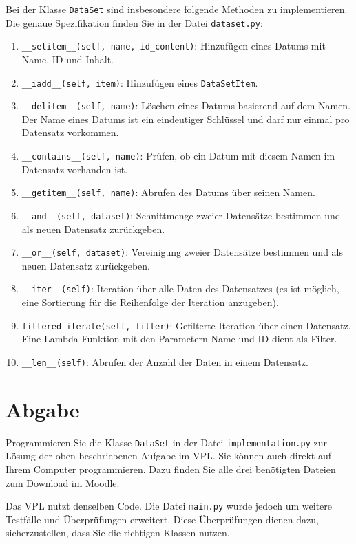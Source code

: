 \documentclass[]{article}
\begin{document}
Bei der Klasse \texttt{DataSet} sind insbesondere folgende Methoden zu implementieren. Die genaue Spezifikation finden Sie in der Datei \texttt{dataset.py}:

\begin{enumerate}
    \item \texttt{\_\_setitem\_\_(self, name, id\_content)}: Hinzufügen eines Datums mit Name, ID und Inhalt.
    \item \texttt{\_\_iadd\_\_(self, item)}: Hinzufügen eines \texttt{DataSetItem}.
    \item \texttt{\_\_delitem\_\_(self, name)}: Löschen eines Datums basierend auf dem Namen. Der Name eines Datums ist ein eindeutiger Schlüssel und darf nur einmal pro Datensatz vorkommen.
    \item \texttt{\_\_contains\_\_(self, name)}: Prüfen, ob ein Datum mit diesem Namen im Datensatz vorhanden ist.
    \item \texttt{\_\_getitem\_\_(self, name)}: Abrufen des Datums über seinen Namen.
    \item \texttt{\_\_and\_\_(self, dataset)}: Schnittmenge zweier Datensätze bestimmen und als neuen Datensatz zurückgeben.
    \item \texttt{\_\_or\_\_(self, dataset)}: Vereinigung zweier Datensätze bestimmen und als neuen Datensatz zurückgeben.
    \item \texttt{\_\_iter\_\_(self)}: Iteration über alle Daten des Datensatzes (es ist möglich, eine Sortierung für die Reihenfolge der Iteration anzugeben).
    \item \texttt{filtered\_iterate(self, filter)}: Gefilterte Iteration über einen Datensatz. Eine Lambda-Funktion mit den Parametern Name und ID dient als Filter.
    \item \texttt{\_\_len\_\_(self)}: Abrufen der Anzahl der Daten in einem Datensatz.
\end{enumerate}

\section*{Abgabe}
Programmieren Sie die Klasse \texttt{DataSet} in der Datei \texttt{implementation.py} zur Lösung der oben beschriebenen Aufgabe im VPL. Sie können auch direkt auf Ihrem Computer programmieren. Dazu finden Sie alle drei benötigten Dateien zum Download im Moodle.

Das VPL nutzt denselben Code. Die Datei \texttt{main.py} wurde jedoch um weitere Testfälle und Überprüfungen erweitert. Diese Überprüfungen dienen dazu, sicherzustellen, dass Sie die richtigen Klassen nutzen.
\end{document}
